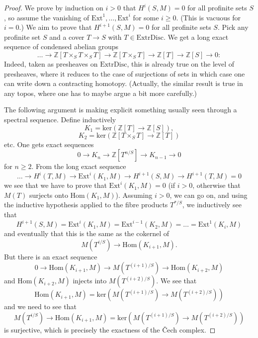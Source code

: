 \begin{proof}
  \leanok
  We prove by induction on $i>0$ that $H^i(S,M)=0$ for all profinite sets $S$, so assume the vanishing of $\mathrm{Ext}^1,\ldots,\mathrm{Ext}^i$ for some $i\geq 0$.
  (This is vacuous for $i=0$.)
  We aim to prove that $H^{i+1}(S,M)=0$ for all profinite sets $S$.
  Pick any profinite set $S$ and a cover $T\to S$ with $T\in \mathrm{ExtrDisc}$.
  We get a long exact sequence of condensed abelian groups
  \[ \ldots\longrightarrow \mathbb Z[T\times_S T\times_S T]\longrightarrow \mathbb Z[T\times_S T]\longrightarrow \mathbb Z[T]\longrightarrow \mathbb Z[S]\longrightarrow 0: \]
  Indeed, taken as presheaves on $\mathrm{ExtrDisc}$, this is already true on the level of presheaves,
  where it reduces to the case of surjections of sets in which case one can write down a contracting homotopy.
  (Actually, the similar result is true in any topos, where one has to maybe argue a bit more carefully.)

  The following argument is making explicit something usually seen through a spectral sequence. Define inductively
  \[ K_1=\mathrm{ker}(\mathbb Z[T]\longrightarrow \mathbb Z[S]), \]
  \[ K_2=\mathrm{ker}(\mathbb Z[T\times_S T]\longrightarrow \mathbb Z[T]) \]
  etc. One gets exact sequences
  \[ 0\longrightarrow K_n\longrightarrow \mathbb Z[T^{n/S}]\longrightarrow K_{n-1}\longrightarrow 0 \]
  for $n\geq 2$. From the long exact sequence
  \[ \ldots\longrightarrow H^i(T,M)\longrightarrow \mathrm{Ext}^i(K_1,M)\longrightarrow H^{i+1}(S,M)\longrightarrow H^{i+1}(T,M)=0 \]
  we see that we have to prove that $\mathrm{Ext}^i(K_1,M)=0$ (if $i>0$, otherwise that $M(T)$ surjects onto $\mathrm{Hom}(K_1,M)$).
  Assuming $i>0$, we can go on, and using the inductive hypothesis applied to the fibre products $T^{\ast/S}$, we inductively see that
  \[ H^{i+1}(S,M)=\mathrm{Ext}^i(K_1,M)=\mathrm{Ext}^{i-1}(K_2,M)=\ldots=\mathrm{Ext}^1(K_i,M) \]
  and eventually that this is the same as the cokernel of
  \[ M(T^{i/S})\longrightarrow \mathrm{Hom}(K_{i+1},M).  \]
  But there is an exact sequence
  \[ 0\longrightarrow \mathrm{Hom}(K_{i+1},M)\longrightarrow M(T^{(i+1)/S})\longrightarrow \mathrm{Hom}(K_{i+2},M) \]
  and $\mathrm{Hom}(K_{i+2},M)$ injects into $M(T^{(i+2)/S})$. We see that
  \[ \mathrm{Hom}(K_{i+1},M)=\mathrm{ker}(M(T^{(i+1)/S})\longrightarrow M(T^{(i+2)/S})) \]
  and we need to see that
  \[ M(T^{i/S})\longrightarrow \mathrm{Hom}(K_{i+1},M)=\mathrm{ker}(M(T^{(i+1)/S})\longrightarrow M(T^{(i+2)/S})) \]
  is surjective, which is precisely the exactness of the \v{C}ech complex.
\end{proof}

